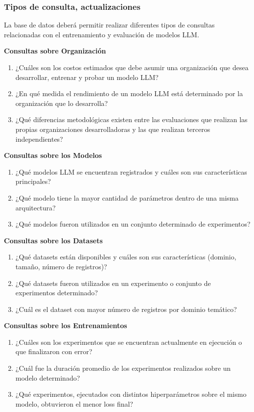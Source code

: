 \documentclass[12pt,a4paper]{article}
\begin{document}
\subsubsection{Tipos de consulta, actualizaciones}

La base de datos deberá permitir realizar diferentes tipos de consultas relacionadas con el entrenamiento y evaluación de modelos LLM.

\textbf{Consultas sobre Organización}
{\begin{enumerate}
  \item ¿Cuáles son los costos estimados que debe asumir una organización que desea desarrollar, entrenar y probar un modelo LLM?
  \item ¿En qué medida el rendimiento de un modelo LLM está determinado por la organización que lo desarrolla?
  \item ¿Qué diferencias metodológicas existen entre las evaluaciones que realizan las propias organizaciones desarrolladoras y las que realizan terceros independientes?
\end{enumerate}
}

\textbf{Consultas sobre los Modelos}
{\begin{enumerate}
  \item ¿Qué modelos LLM se encuentran registrados y cuáles son sus características principales?
  \item ¿Qué modelo tiene la mayor cantidad de parámetros dentro de una misma arquitectura?
  \item ¿Qué modelos fueron utilizados en un conjunto determinado de experimentos?
\end{enumerate}
}

\textbf{Consultas sobre los Datasets}
{\begin{enumerate}
  \item ¿Qué datasets están disponibles y cuáles son sus características (dominio, tamaño, número de registros)?
  \item ¿Qué datasets fueron utilizados en un experimento o conjunto de experimentos determinado?
  \item ¿Cuál es el dataset con mayor número de registros por dominio temático?
\end{enumerate}
}

\textbf{Consultas sobre los Entrenamientos}
{\begin{enumerate}
  \item ¿Cuáles son los experimentos que se encuentran actualmente en ejecución o que finalizaron con error?
  \item ¿Cuál fue la duración promedio de los experimentos realizados sobre un modelo determinado?
  \item ¿Qué experimentos, ejecutados con distintos hiperparámetros sobre el mismo modelo, obtuvieron el menor loss final?
\end{enumerate}
}
\end{document}
